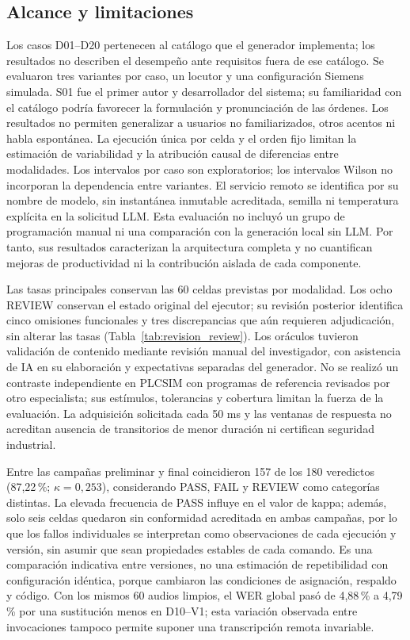\documentclass[a4paper,fleqn]{cas-dc}
\begin{document}
\subsection{Alcance y limitaciones}
Los casos D01--D20 pertenecen al catálogo que el generador implementa; los resultados no describen el desempeño ante requisitos fuera de ese catálogo. Se evaluaron tres variantes por caso, un locutor y una configuración Siemens simulada. S01 fue el primer autor y desarrollador del sistema; su familiaridad con el catálogo podría favorecer la formulación y pronunciación de las órdenes. Los resultados no permiten generalizar a usuarios no familiarizados, otros acentos ni habla espontánea. La ejecución única por celda y el orden fijo limitan la estimación de variabilidad y la atribución causal de diferencias entre modalidades. Los intervalos por caso son exploratorios; los intervalos Wilson no incorporan la dependencia entre variantes. El servicio remoto se identifica por su nombre de modelo, sin instantánea inmutable acreditada, semilla ni temperatura explícita en la solicitud LLM. Esta evaluación no incluyó un grupo de programación manual ni una comparación con la generación local sin LLM. Por tanto, sus resultados caracterizan la arquitectura completa y no cuantifican mejoras de productividad ni la contribución aislada de cada componente.

Las tasas principales conservan las 60 celdas previstas por modalidad. Los ocho REVIEW conservan el estado original del ejecutor; su revisión posterior identifica cinco omisiones funcionales y tres discrepancias que aún requieren adjudicación, sin alterar las tasas (Tabla~\ref{tab:revision_review}). Los oráculos tuvieron validación de contenido mediante revisión manual del investigador, con asistencia de IA en su elaboración y expectativas separadas del generador. No se realizó un contraste independiente en PLCSIM con programas de referencia revisados por otro especialista; sus estímulos, tolerancias y cobertura limitan la fuerza de la evaluación. La adquisición solicitada cada 50 ms y las ventanas de respuesta no acreditan ausencia de transitorios de menor duración ni certifican seguridad industrial.

Entre las campañas preliminar y final coincidieron 157 de los 180 veredictos (87,22\,\%; $\kappa=0,253$), considerando PASS, FAIL y REVIEW como categorías distintas. La elevada frecuencia de PASS influye en el valor de kappa; además, solo seis celdas quedaron sin conformidad acreditada en ambas campañas, por lo que los fallos individuales se interpretan como observaciones de cada ejecución y versión, sin asumir que sean propiedades estables de cada comando. Es una comparación indicativa entre versiones, no una estimación de repetibilidad con configuración idéntica, porque cambiaron las condiciones de asignación, respaldo y código. Con los mismos 60 audios limpios, el WER global pasó de 4,88\,\% a 4,79\,\% por una sustitución menos en D10--V1; esta variación observada entre invocaciones tampoco permite suponer una transcripción remota invariable.
\end{document}
